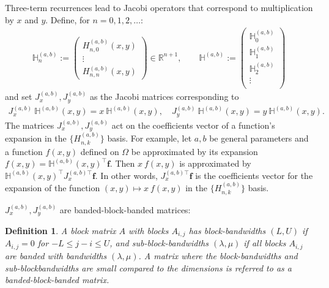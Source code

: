 \documentclass[11pt, oneside]{article}   	%
\newcommand{\R}{\mathbb{R}}
\newcommand{\hdop}{H}
\newcommand{\bighdop}{\mathbb{\hdop}}
\newcommand{\hdopab}{\hdop^{(a,b)}}
\newcommand{\hdopnkab}{\hdop_{n,k}^{(a,b)}}
\newcommand{\bighdopab}{\bighdop^{(a,b)}}
\newtheorem{definition}{Definition}
\begin{document}
Three-term recurrences lead to Jacobi operators that correspond to multiplication by $x$ and $y$. Define, for $n=0,1,2,\dots$: 
\begin{align*}
\bighdopab_n := \begin{pmatrix}
		\hdopab_{n,0}(x,y) \\
		\vdots \\
		\hdopab_{n,n}(x,y)
	\end{pmatrix} \in \R^{n+1}, 
\quad \quad 
\bighdopab := \begin{pmatrix}
		\bighdopab_0 \\
		\bighdopab_1 \\
		\bighdopab_2 \\
		\vdots \\
	\end{pmatrix}
\end{align*}
and set $J_x^{(a,b)}, J_y^{(a,b)}$ as the Jacobi matrices corresponding to
\begin{align}
J_x^{(a,b)} \: \bighdopab(x,y) = x \: \bighdopab(x,y), \quad J_y^{(a,b)} \: \bighdopab(x,y) = y \: \bighdopab(x,y).
\label{eqn:jacobimatricesdefinition}
\end{align}
The matrices $J_x^{(a,b)}, J_y^{(a,b)}$ act on the coefficients vector of a function's expansion in the $\{\hdopnkab\}$ basis. For example, let $a, b$ be general parameters and a function $f(x,y)$ defined on $\Omega$ be approximated by its expansion $f(x,y) = \bighdopab(x,y)^\top \mathbf{f}$. Then $x \: f(x,y)$ is approximated by $\bighdopab(x,y)^\top {J_x^{(a,b)\top}} \mathbf{f}$. In other words, ${J_x^{(a,b)\top}} \mathbf{f}$ is the coefficients vector for the expansion of the function $(x,y) \mapsto x \: f(x,y)$ in the  $\{\hdopnkab\}$ basis.



$J_x^{(a,b)}, J_y^{(a,b)}$ are banded-block-banded matrices:

\begin{definition}
A block matrix $A$ with blocks $A_{i,j}$ has block-bandwidths $(L,U)$ if $A_{i,j} = 0$ for $- L \leq j-i \leq U$, and sub-block-bandwidths $(\lambda, \mu)$ if all blocks $A_{i,j}$ are banded with bandwidths $(\lambda,\mu)$. A matrix where the block-bandwidths and sub-blockbandwidths are small compared to the dimensions is referred to as a banded-block-banded matrix. 
\end{definition}
\end{document}
